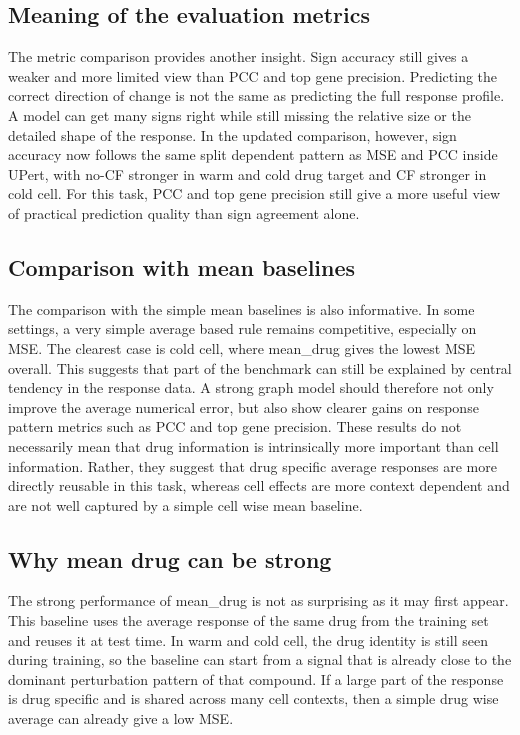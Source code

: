 \subsection{Meaning of the evaluation metrics}
\noindent The metric comparison provides another insight. Sign accuracy still gives a weaker and more limited view than PCC and top gene precision. Predicting the correct direction of change is not the same as predicting the full response profile. A model can get many signs right while still missing the relative size or the detailed shape of the response. In the updated comparison, however, sign accuracy now follows the same split dependent pattern as MSE and PCC inside UPert, with no-CF stronger in warm and cold drug target and CF stronger in cold cell. For this task, PCC and top gene precision still give a more useful view of practical prediction quality than sign agreement alone.

\subsection{Comparison with mean baselines}
\noindent The comparison with the simple mean baselines is also informative. In some settings, a very simple average based rule remains competitive, especially on MSE. The clearest case is cold cell, where mean\_drug gives the lowest MSE overall. This suggests that part of the benchmark can still be explained by central tendency in the response data. A strong graph model should therefore not only improve the average numerical error, but also show clearer gains on response pattern metrics such as PCC and top gene precision. These results do not necessarily mean that drug information is intrinsically more important than cell information. Rather, they suggest that drug specific average responses are more directly reusable in this task, whereas cell effects are more context dependent and are not well captured by a simple cell wise mean baseline.

\subsection{Why mean drug can be strong}
\noindent The strong performance of mean\_drug is not as surprising as it may first appear. This baseline uses the average response of the same drug from the training set and reuses it at test time. In warm and cold cell, the drug identity is still seen during training, so the baseline can start from a signal that is already close to the dominant perturbation pattern of that compound. If a large part of the response is drug specific and is shared across many cell contexts, then a simple drug wise average can already give a low MSE.

